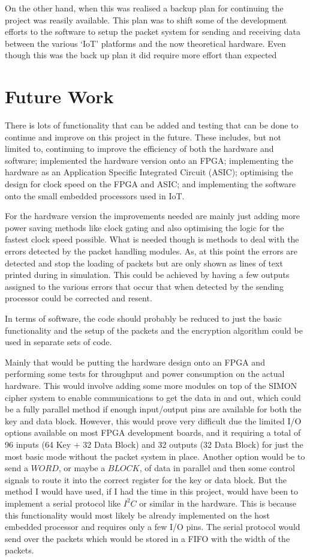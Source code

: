 \documentclass[12pt,twoside,a4paper]{report}
\begin{document}
	On the other hand, when this was realised a backup plan for continuing the project was reasily available. This plan was to shift some of the development efforts to the software to setup the packet system for sending and receiving data between the various `IoT' platforms and the now theoretical hardware. Even though this was the back up plan it did require more effort than expected  
		
	\section{Future Work}
	There is lots of functionality that can be added and testing that can be done to continue and improve on this project in the future. These includes, but not limited to, continuing to improve the efficiency of both the hardware and software; implemented the hardware version onto an FPGA; implementing the hardware as an Application Specific Integrated Circuit (ASIC); optimising the design for clock speed on the FPGA and ASIC; and implementing the software onto the small embedded processors used in IoT.
	
	For the hardware version the improvements needed are mainly just adding more power saving methods like clock gating and also optimising the logic for the fastest clock speed possible. What is needed though is methods to deal with the errors detected by the packet handling modules. As, at this point the errors are detected and stop the loading of packets but are only shown as lines of text printed during in simulation. This could be achieved by having a few outputs assigned to the various errors that occur that when detected by the sending processor could be corrected and resent.
	
	In terms of software, the code should probably be reduced to just the basic functionality and the setup of the packets and the encryption algorithm could be used in separate sets of code. 
	
	Mainly that would be putting the hardware design onto an FPGA and performing some tests for throughput and power consumption on the actual hardware. This would involve adding some more modules on top of the SIMON cipher system to enable communications to get the data in and out, which could be a fully parallel method if enough input/output pins are available for both the key and data block. However, this would prove very difficult due the limited I/O options available on most FPGA development boards, and it requiring a total of 96 inputs (64 Key + 32 Data Block) and 32 outputs (32 Data Block) for just the most basic mode without the packet system in place. Another option would be to send a $WORD$, or maybe a $BLOCK$, of data in parallel and then some control signals to route it into the correct register for the key or data block. But the method I would have used, if I had the time in this project, would have been to implement a serial protocol like $I^2C$ or similar in the hardware. This is because this functionality would most likely be already implemented on the host embedded processor and requires only a few I/O pins. The serial protocol would send over the packets which would be stored in a FIFO with the width of the packets.
	
\end{document}

